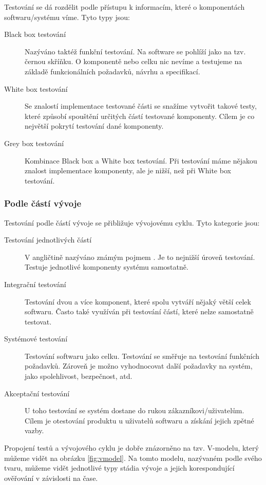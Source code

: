 Testování se dá rozdělit podle přístupu k informacím, které o komponentách softwaru/systému víme. Tyto typy jsou:

\begin{description}
    \item[Black box testování] Nazýváno taktéž funkční testování. Na software se pohlíží jako na tzv. černou skříňku. O komponentě nebo celku nic nevíme a testujeme na základě funkcionálních požadavků, návrhu a specifikací. 
    \item[White box testování] Se znalostí implementace testované části se snažíme vytvořit takové testy, které způsobí spouštění určitých částí testované komponenty. Cílem je co největší pokrytí testování dané komponenty.
    \item[Grey box testování] Kombinace Black box a White box testování. Při testování máme nějakou znalost implementace komponenty, ale je nižší, než při White box testování. \cite{khan2010different}
\end{description}

\subsubsection{Podle částí vývoje}

Testování podle částí vývoje se přibližuje vývojovému cyklu. Tyto kategorie jsou:  

\begin{description}
    \item[Testování jednotlivých částí] V angličtině nazýváno známým pojmem . Je to nejnižší úroveň testování. Testuje jednotlivé komponenty systému samostatně.
    \item[Integrační testování] Testování dvou a více komponent, které spolu vytváří nějaký větší celek softwaru. Často také využíván při testování částí, které nelze samostatně testovat.
    \item[Systémové testování] Testování softwaru jako celku. Testování se směřuje na testování funkčních požadavků. Zároveň je možno vyhodnocovat další požadavky na systém, jako spolehlivost, bezpečnost, atd.
    \item[Akceptační testování] U toho testování se systém dostane do rukou zákazníkovi/uživatelům. Cílem je otestování produktu u uživatelů softwaru a získání jejich zpětné vazby. 
\end{description}

Propojení testů a vývojového cyklu je dobře znázorněno na tzv. V-modelu, který můžeme vidět na obrázku \ref{fig:vmodel}. Na tomto modelu, nazývaném podle svého tvaru, můžeme vidět jednotlivé typy stádia vývoje a jejich korespondující ověřování v závislosti na čase.

